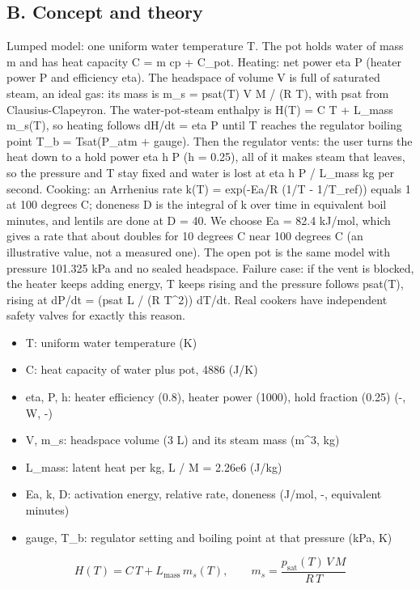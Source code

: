 \documentclass[11pt,a4paper]{article}
\begin{document}
\subsection*{B. Concept and theory}
Lumped model: one uniform water temperature T. The pot holds water of mass m and has heat capacity C = m cp + C\_pot. Heating: net power eta P (heater power P and efficiency eta). The headspace of volume V is full of saturated steam, an ideal gas: its mass is m\_s = psat(T) V M / (R T), with psat from Clausius-Clapeyron. The water-pot-steam enthalpy is H(T) = C T + L\_mass m\_s(T), so heating follows dH/dt = eta P until T reaches the regulator boiling point T\_b = Tsat(P\_atm + gauge). Then the regulator vents: the user turns the heat down to a hold power eta h P (h = 0.25), all of it makes steam that leaves, so the pressure and T stay fixed and water is lost at eta h P / L\_mass kg per second. Cooking: an Arrhenius rate k(T) = exp(-Ea/R (1/T - 1/T\_ref)) equals 1 at 100 degrees C; doneness D is the integral of k over time in equivalent boil minutes, and lentils are done at D = 40. We choose Ea = 82.4 kJ/mol, which gives a rate that about doubles for 10 degrees C near 100 degrees C (an illustrative value, not a measured one). The open pot is the same model with pressure 101.325 kPa and no sealed headspace. Failure case: if the vent is blocked, the heater keeps adding energy, T keeps rising and the pressure follows psat(T), rising at dP/dt = (psat L / (R T\textasciicircum{}2)) dT/dt. Real cookers have independent safety valves for exactly this reason.

\begin{itemize}[nosep]
\item T: uniform water temperature (K)
\item C: heat capacity of water plus pot, 4886 (J/K)
\item eta, P, h: heater efficiency (0.8), heater power (1000), hold fraction (0.25) (-, W, -)
\item V, m\_s: headspace volume (3 L) and its steam mass (m\textasciicircum{}3, kg)
\item L\_mass: latent heat per kg, L / M = 2.26e6 (J/kg)
\item Ea, k, D: activation energy, relative rate, doneness (J/mol, -, equivalent minutes)
\item gauge, T\_b: regulator setting and boiling point at that pressure (kPa, K)
\end{itemize}

\begin{equation*}
H(T)=C\,T+L_{\mathrm{mass}}\,m_s(T),\qquad m_s=\frac{p_{\mathrm{sat}}(T)\,V\,M}{R\,T}
\end{equation*}
\end{document}
